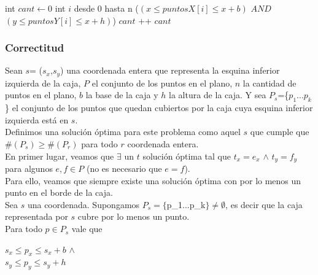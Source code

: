 \begin{algorithm}[H]
\caption{} 
\begin{codebox}
\li int $cant \gets 0$
\li \For int $i$ desde 0 hasta n \Do
\li 	\If ($(x \leq puntosX[i] \leq x+b)$  $AND$  $(y \leq puntosY[i] \leq x+h)$) \Do
\li 		$cant$ ++		
 		\End
 	\End	
\li \Return $cant $
\End
\end{codebox}
\end{algorithm}

\subsubsection{Correctitud}

\indent Sean $s$= ($s_{x}$,$s_{y}$) una coordenada entera que representa la esquina inferior izquierda de la caja, $P$ el conjunto de los puntos en el plano, $n$ la cantidad de puntos en el plano, $b$ la base de la caja y $h$ la altura de la caja. Y sea $P_{s}$=\{$p_{1}...p_{k}$\} el conjunto de los puntos que quedan cubiertos por la caja cuya esquina inferior izquierda est\'a en $s$.\\

\indent Definimos una soluci\'on \'optima para este problema como aquel $s$ que cumple que $\#(P_{s}) \geq \#(P_{r}) $ para todo $r$ coordenada entera.\\

\indent En primer lugar, veamos que $\exists$ un $t$ soluci\'on \'optima tal que $t_{x} = e_{x}$ $\wedge$ $t_{y}=f_{y}$ para algunos $e,f \in P$ (no es necesario que $e=f$).\\

\indent Para ello, veamos que siempre existe una soluci\'on \'optima con por lo menos un punto en el borde de la caja.\\

\indent Sea $s$ una coordenada. Supongamos $P_{s}=\{$p_{1}...p_{k}$\}\neq \emptyset$, es decir que la caja representada por $s$ cubre por lo menos un punto.\\
\indent Para todo $p \in P_{s}$ vale que \\
\begin{center}
$s_{x} \leq p_{x} \leq s_{x} + b$  $\wedge$ \\
$s_{y} \leq p_{y} \leq s_{y} + h$\\
\end{center}\\

